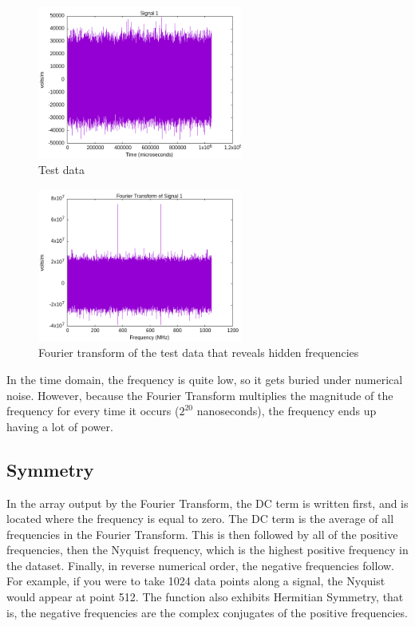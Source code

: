 \documentclass[12pt, reqno]{amsart}
\begin{document}
    \begin{figure}[h]
        \centering
        \includegraphics[width=0.6\textwidth]{test_08.png}
        \caption{Test data}
        \label{fig:test-08}
    \end{figure}
        \begin{figure}[h]
        \centering
        \includegraphics[width=0.6\textwidth]{fft_test_08.png}
        \caption{Fourier transform of the test data that reveals hidden frequencies}
        \label{fig:fft-test-08}
    \end{figure}

In the time domain, the frequency is quite low, so it gets buried under numerical noise. However, because the Fourier Transform multiplies the magnitude of the frequency for every time it occurs ($2^{20}$ nanoseconds), the frequency ends up having a lot of power.

\subsection{Symmetry}
\noindent In the array output by the Fourier Transform, the DC term is written first, and is located where the frequency is equal to zero. The DC term is the average of all frequencies in the Fourier Transform. This is then followed by all of the positive frequencies, then the Nyquist frequency, which is the highest positive frequency in the dataset. Finally, in reverse numerical order, the negative frequencies follow. For example, if you were to take 1024 data points along a signal, the Nyquist would appear at point 512. The function also exhibits Hermitian Symmetry, that is, the negative frequencies are the complex conjugates of the positive frequencies. 
\end{document}
